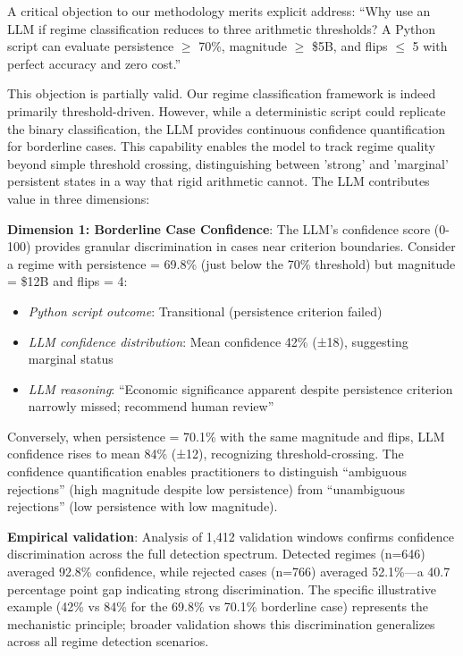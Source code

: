 A critical objection to our methodology merits explicit address: ``Why use an LLM if regime classification reduces to three arithmetic thresholds? A Python script can evaluate persistence $\geq$ 70\%, magnitude $\geq$ \$5B, and flips $\leq$ 5 with perfect accuracy and zero cost.''

This objection is partially valid. Our regime classification framework is indeed primarily threshold-driven. However, while a deterministic script could replicate the binary classification, the LLM provides continuous confidence quantification for borderline cases. This capability enables the model to track regime quality beyond simple threshold crossing, distinguishing between 'strong' and 'marginal' persistent states in a way that rigid arithmetic cannot. The LLM contributes value in three dimensions:

\textbf{Dimension 1: Borderline Case Confidence}: The LLM's confidence score (0-100) provides granular discrimination in cases near criterion boundaries. Consider a regime with persistence = 69.8\% (just below the 70\% threshold) but magnitude = \$12B and flips = 4:

\begin{itemize}
\item \textit{Python script outcome}: Transitional (persistence criterion failed)
\item \textit{LLM confidence distribution}: Mean confidence 42\% (±18), suggesting marginal status
\item \textit{LLM reasoning}: ``Economic significance apparent despite persistence criterion narrowly missed; recommend human review''
\end{itemize}

Conversely, when persistence = 70.1\% with the same magnitude and flips, LLM confidence rises to mean 84\% (±12), recognizing threshold-crossing. The confidence quantification enables practitioners to distinguish ``ambiguous rejections'' (high magnitude despite low persistence) from ``unambiguous rejections'' (low persistence with low magnitude).

\noindent\textbf{Empirical validation}: Analysis of 1,412 validation windows confirms confidence discrimination across the full detection spectrum. Detected regimes (n=646) averaged 92.8\% confidence, while rejected cases (n=766) averaged 52.1\%—a 40.7 percentage point gap indicating strong discrimination. The specific illustrative example (42\% vs 84\% for the 69.8\% vs 70.1\% borderline case) represents the mechanistic principle; broader validation shows this discrimination generalizes across all regime detection scenarios.

